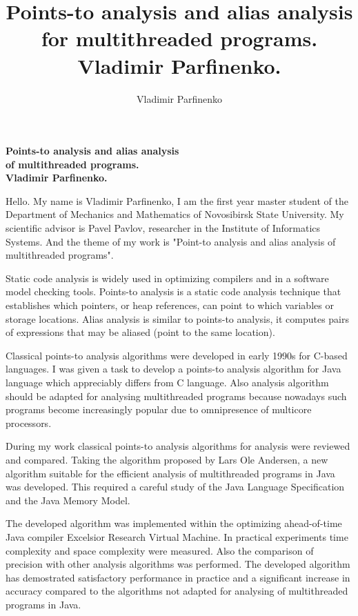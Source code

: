 \documentclass[12pt]{article}
\title{
  Points-to analysis and alias analysis for multithreaded programs.
  Vladimir Parfinenko.
}
\author{
  Vladimir Parfinenko
}
\begin{document}
  \thispagestyle{empty}

  \begin{center}
    \bfseries
    Points-to analysis and alias analysis\\
    of multithreaded programs.\\
    Vladimir Parfinenko.
  \end{center}
  \vspace{0.5cm}

  Hello. My name is Vladimir Parfinenko, I am the first year master student of
  the Department of Mechanics and Mathematics of Novosibirsk State University.
  My scientific advisor is Pavel Pavlov, researcher in the Institute of
  Informatics Systems. And the theme of my work is "Point-to analysis and alias
  analysis of multithreaded programs".

  Static code analysis is widely used in optimizing compilers and in a software
  model checking tools. Points-to analysis is a static code analysis technique
  that establishes which pointers, or heap references, can point to which
  variables or storage locations. Alias analysis is similar to points-to
  analysis, it computes pairs of expressions that may be aliased (point to the
  same location).

  Classical points-to analysis algorithms were developed in early 1990s for
  C-based languages. I was given a task to develop a points-to analysis
  algorithm for Java language which appreciably differs from C language.
  Also analysis algorithm should be adapted for analysing multithreaded
  programs because nowadays such programs become increasingly popular
  due to omnipresence of multicore processors.

  During my work classical points-to analysis algorithms for analysis were
  reviewed and compared. Taking the algorithm proposed by Lars Ole Andersen, a
  new algorithm suitable for the efficient analysis of multithreaded programs
  in Java was developed. This required a careful study of the Java Language
  Specification and the Java Memory Model.

  The developed algorithm was implemented within the optimizing ahead-of-time
  Java compiler Excelsior Research Virtual Machine. In practical experiments
  time complexity and space complexity were measured. Also the comparison of
  precision with other analysis algorithms was performed. The developed
  algorithm has demostrated satisfactory performance in practice and a
  significant increase in accuracy compared to the algorithms not adapted for
  analysing of multithreaded programs in Java.
\end{document}
